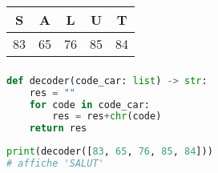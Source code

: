 \documentclass[svgnames,11pt]{beamer}
\begin{document}
\begin{frame}
    \frametitle{}

    \begin{center}
        \begin{tabular}{|*{5}{c|}}
            \hline
            S&A&L&U&T\\
            \hline
            83& 65& 76& 85&84\\
            \hline
        \end{tabular}
    \end{center}

\end{frame}
\begin{frame}[fragile]
    \frametitle{}

\begin{center}
\begin{lstlisting}[language=Python , basicstyle=\ttfamily\small, xleftmargin=2em, xrightmargin=2em]
def decoder(code_car: list) -> str:
    res = ""
    for code in code_car:
        res = res+chr(code)
    return res
\end{lstlisting}
\end{center}
\begin{center}
\begin{lstlisting}[language=Python , basicstyle=\ttfamily\small, xleftmargin=2em, xrightmargin=2em]
print(decoder([83, 65, 76, 85, 84]))
# affiche 'SALUT'
\end{lstlisting}
\label{CODE}
\end{center}
\end{frame}
\end{document}
